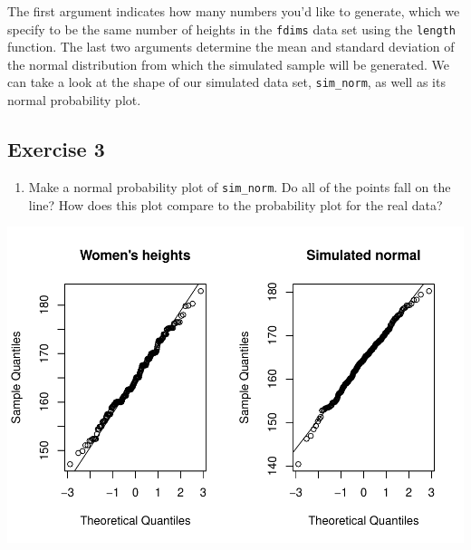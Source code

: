 \documentclass[]{article}
\newenvironment{Shaded}{\begin{snugshade}}{\end{snugshade}}
\newcommand{\KeywordTok}[1]{\textcolor[rgb]{0.13,0.29,0.53}{\textbf{{#1}}}}
\newcommand{\DataTypeTok}[1]{\textcolor[rgb]{0.13,0.29,0.53}{{#1}}}
\newcommand{\DecValTok}[1]{\textcolor[rgb]{0.00,0.00,0.81}{{#1}}}
\newcommand{\StringTok}[1]{\textcolor[rgb]{0.31,0.60,0.02}{{#1}}}
\newcommand{\NormalTok}[1]{{#1}}
\providecommand{\tightlist}{%
  \setlength{\itemsep}{0pt}\setlength{\parskip}{0pt}}
\begin{document}
\begin{Shaded}
\end{Shaded}

The first argument indicates how many numbers you'd like to generate,
which we specify to be the same number of heights in the \texttt{fdims}
data set using the \texttt{length} function. The last two arguments
determine the mean and standard deviation of the normal distribution
from which the simulated sample will be generated. We can take a look at
the shape of our simulated data set, \texttt{sim\_norm}, as well as its
normal probability plot.

\subsection{Exercise 3}\label{exercise-3}

\begin{enumerate}
\def\labelenumi{\arabic{enumi}.}
\setcounter{enumi}{2}
\tightlist
\item
  Make a normal probability plot of \texttt{sim\_norm}. Do all of the
  points fall on the line? How does this plot compare to the probability
  plot for the real data?
\end{enumerate}

\begin{Shaded}
\end{Shaded}

\includegraphics{Lab_3_files/figure-latex/unnamed-chunk-3-1.pdf}
\end{document}
